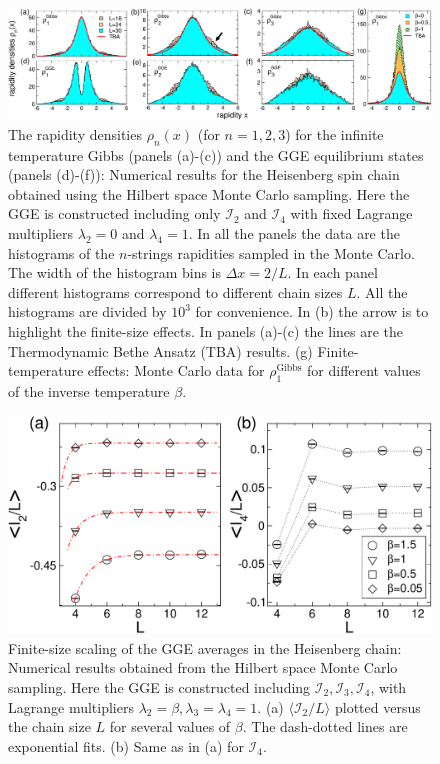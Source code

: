 \documentclass[twocolumn,superscriptaddress,prb,10pt]{revtex4-1}
\begin{document}
\begin{figure}[t]
\includegraphics*[width=0.99\linewidth]{./draft_figs/fig2}
\caption{The rapidity densities $\rho_n(x)$ (for $n=1,2,3$) for the infinite temperature 
 Gibbs (panels (a)-(c)) and the GGE equilibrium states (panels (d)-(f)): Numerical  
 results for the Heisenberg spin chain obtained using the Hilbert space Monte Carlo 
 sampling. Here the GGE is constructed including only ${\mathcal I}_2$ and ${\mathcal I}_4$ 
 with fixed Lagrange multipliers $\lambda_2=0$ and $\lambda_4=1$. In all the panels the 
 data are the histograms of the $n$-strings rapidities sampled in the Monte Carlo.
 The width of the histogram bins is $\Delta x=2/L$. In each panel different histograms 
 correspond to different chain sizes $L$. All the histograms are divided by $10^3$ for 
 convenience. In (b) the arrow is to highlight the finite-size effects. In panels (a)-(c) 
 the lines are the Thermodynamic Bethe Ansatz (TBA) results. (g) Finite-temperature 
 effects: Monte Carlo data for $\rho^{\textrm{Gibbs}}_1$ for different values of the 
 inverse temperature $\beta$.
}
\label{fig2}
\end{figure}

\begin{figure}[t]
\includegraphics*[width=0.93\linewidth]{./draft_figs/fig3}
\caption{Finite-size scaling of the GGE averages in the Heisenberg chain: Numerical results 
 obtained from the Hilbert space Monte Carlo sampling. Here the GGE is constructed including 
 ${\mathcal I}_2, {\mathcal I}_3, {\mathcal I}_4$, with Lagrange multipliers $\lambda_2=\beta,
 \lambda_3=\lambda_4=1$. (a) $\langle {\mathcal I}_2/L\rangle$ plotted versus the chain size 
 $L$ for several values of $\beta$. The dash-dotted lines are exponential fits. (b) Same as 
 in (a) for ${\mathcal I}_4$.
}
\label{finite-size}
\end{figure}
\end{document}
